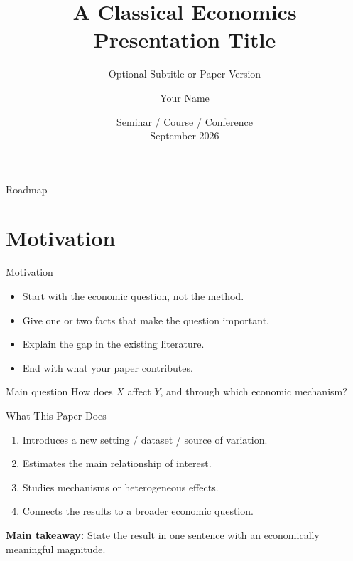 \documentclass[10pt,aspectratio=169]{beamer}
\title[Short Paper Title]{A Classical Economics Presentation Title}
\subtitle{Optional Subtitle or Paper Version}
\author[Your Name]{Your Name}
\institute[University]{Department of Economics \\ Your University}
\date{Seminar / Course / Conference \\ September 2026}
\begin{document}

\begin{frame}
  \titlepage
\end{frame}

\begin{frame}{Roadmap}
  \tableofcontents
\end{frame}

\section{Motivation}

\begin{frame}{Motivation}
\begin{itemize}
  \item Start with the economic question, not the method.
  \item Give one or two facts that make the question important.
  \item Explain the gap in the existing literature.
  \item End with what your paper contributes.
\end{itemize}

\vspace{0.6em}
\begin{block}{Main question}
How does $X$ affect $Y$, and through which economic mechanism?
\end{block}
\end{frame}

\begin{frame}{What This Paper Does}
\begin{enumerate}
  \item Introduces a new setting / dataset / source of variation.
  \item Estimates the main relationship of interest.
  \item Studies mechanisms or heterogeneous effects.
  \item Connects the results to a broader economic question.
\end{enumerate}

\vspace{0.8em}
\textbf{Main takeaway:} State the result in one sentence with an economically meaningful magnitude.
\end{frame}
\end{document}
